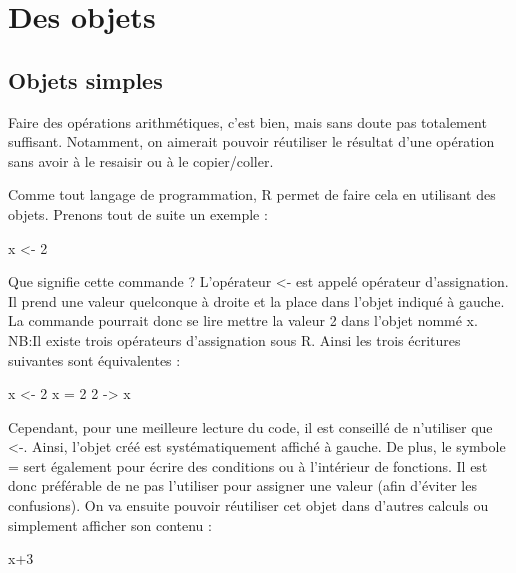 \documentclass[
]{book}
\newenvironment{Shaded}{\begin{snugshade}}{\end{snugshade}}
\newcommand{\DecValTok}[1]{\textcolor[rgb]{0.00,0.00,0.81}{#1}}
\newcommand{\NormalTok}[1]{#1}
\newcommand{\OtherTok}[1]{\textcolor[rgb]{0.56,0.35,0.01}{#1}}
\newcommand{\SpecialCharTok}[1]{\textcolor[rgb]{0.00,0.00,0.00}{#1}}
\begin{document}
\hypertarget{des-objets}{%
\section{Des objets}\label{des-objets}}

\hypertarget{objets-simples}{%
\subsection{Objets simples}\label{objets-simples}}

Faire des opérations arithmétiques, c'est bien, mais sans doute pas totalement suffisant. Notamment, on aimerait pouvoir réutiliser le résultat d'une opération sans avoir à le resaisir ou à le copier/coller.

Comme tout langage de programmation, R permet de faire cela en utilisant des objets. Prenons tout de suite un exemple :

\begin{Shaded}
\begin{Highlighting}[]
\NormalTok{x }\OtherTok{\textless{}{-}} \DecValTok{2}
\end{Highlighting}
\end{Shaded}

Que signifie cette commande ? L'opérateur \textless- est appelé opérateur d'assignation. Il prend une valeur quelconque à droite et la place dans l'objet indiqué à gauche. La commande pourrait donc se lire mettre la valeur 2 dans l'objet nommé x.
NB:Il existe trois opérateurs d'assignation sous R. Ainsi les trois écritures suivantes sont équivalentes :

\begin{Shaded}
\begin{Highlighting}[]
\NormalTok{x }\OtherTok{\textless{}{-}} \DecValTok{2}
\NormalTok{x }\OtherTok{=} \DecValTok{2}
\DecValTok{2} \OtherTok{{-}\textgreater{}}\NormalTok{ x}
\end{Highlighting}
\end{Shaded}

Cependant, pour une meilleure lecture du code, il est conseillé de n'utiliser que \textless-. Ainsi, l'objet créé est systématiquement affiché à gauche. De plus, le symbole = sert également pour écrire des conditions ou à l'intérieur de fonctions. Il est donc préférable de ne pas l'utiliser pour assigner une valeur (afin d'éviter les confusions).
On va ensuite pouvoir réutiliser cet objet dans d'autres calculs ou simplement afficher son contenu :

\begin{Shaded}
\begin{Highlighting}[]
\NormalTok{x}\SpecialCharTok{+}\DecValTok{3}
\end{Highlighting}
\end{Shaded}
\end{document}
